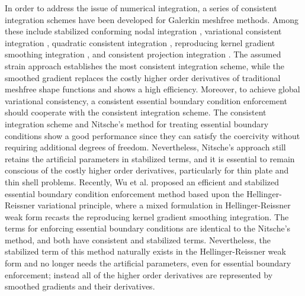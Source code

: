 In order to address the issue of numerical integration, a series of consistent integration schemes have been developed for Galerkin meshfree methods. Among these include stabilized conforming nodal integration \cite{chen2001} , variational consistent integration \cite{chen2013}, quadratic consistent integration \cite{duan2012a}, reproducing kernel gradient smoothing integration \cite{wang2019a}, and consistent projection integration  \cite{wang2023}. The assumed strain approach establishes the most consistent integration scheme, while the smoothed gradient replaces the costly higher order derivatives of traditional meshfree shape functions and shows a high efficiency. Moreover, to achieve global variational consistency, a consistent essential boundary condition enforcement should cooperate with the consistent integration scheme. The consistent integration scheme and Nitsche’s method for treating essential boundary conditions show a good performance since they can satisfy the coercivity without requiring additional degrees of freedom. Nevertheless, Nitsche's approach still retains the artificial parameters in stabilized terms, and it is essential to remain conscious of the costly higher order derivatives, particularly for thin plate and thin shell problems. Recently, Wu et al. \cite{wu2022a,wu2023}  proposed an efficient and stabilized essential boundary condition enforcement method based upon the Hellinger-Reissner variational principle, where a mixed formulation in Hellinger-Reissner weak form recasts the reproducing kernel gradient smoothing integration. The terms for enforcing essential boundary conditions are identical to the Nitsche’s method, and both have consistent and stabilized terms. Nevertheless, the stabilized term of this method naturally exists in the Hellinger-Reissner weak form and no longer needs the artificial parameters, even for essential boundary enforcement; instead all of the higher order derivatives are represented by smoothed gradients and their derivatives.

